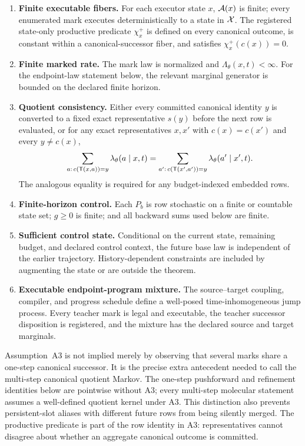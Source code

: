 \begin{enumerate}[
  leftmargin=1.65em,
  label=\textbf{A\arabic*.},
  topsep=0.25em,
  itemsep=0.22em
]
  \item \textbf{Finite executable fibers.}  For each executor state $x$,
  $\mathcal{A}(x)$ is finite; every enumerated mark executes deterministically to a
  state in $\mathcal{X}$. The registered state-only productive predicate
  $\chi_x^+$ is defined on every canonical outcome, is constant within a
  canonical-successor fiber, and satisfies $\chi_x^+(c(x))=0$.
  \item \textbf{Finite marked rate.}  The mark law is normalized and
  $\Lambda_\theta(x,t)<\infty$. For the endpoint-law statement below, the
  relevant marginal generator is bounded on the declared finite horizon.
  \item \textbf{Quotient consistency.}  Either every committed canonical
  identity $y$ is converted to a fixed exact representative $s(y)$ before
  the next row is evaluated, or for any exact representatives $x,x'$ with
  $c(x)=c(x')$ and every $y\neq c(x)$,
  \begin{equation}
    \sum_{a:\,c(\mathsf{T}(x,a))=y}\lambda_\theta(a\mid x,t)
    =
    \sum_{a':\,c(\mathsf{T}(x',a'))=y}
    \lambda_\theta(a'\mid x',t).
    \label{eq:app-compose-lumpability}
  \end{equation}
  The analogous equality is required for any budget-indexed embedded rows.
  \item \textbf{Finite-horizon control.}  Each $P_b$ is row stochastic on a
  finite or countable state set; $g\geq0$ is finite; and all backward sums used
  below are finite.
  \item \textbf{Sufficient control state.}  Conditional on the current state,
  remaining budget, and declared control context, the future base law is
  independent of the earlier trajectory.  History-dependent constraints are
  included by augmenting the state or are outside the theorem.
  \item \textbf{Executable endpoint-program mixture.} The source--target
  coupling, compiler, and progress schedule define a well-posed
  time-inhomogeneous jump process. Every teacher mark is legal and executable,
  the teacher successor disposition is registered, and the mixture has the
  declared source and target marginals.
\end{enumerate}

Assumption~A3 is not implied merely by observing that several marks share a
one-step canonical successor.  It is the precise extra antecedent needed to
call the multi-step canonical quotient Markov.  The one-step pushforward and
refinement identities below are pointwise without A3; every multi-step
molecular statement assumes a well-defined quotient kernel under A3.  This
distinction also prevents persistent-slot aliases with different future rows
from being silently merged. The productive predicate is part of the row
identity in A3: representatives cannot disagree about whether an aggregate
canonical outcome is committed.

